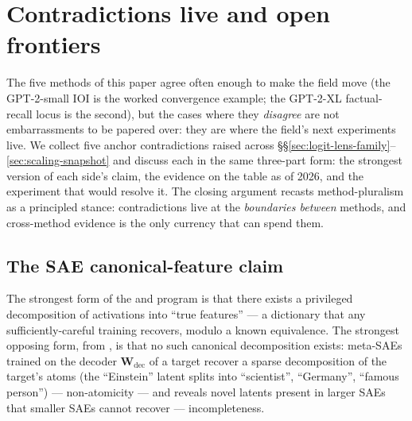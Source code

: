 
\section{Contradictions live and open frontiers}
\label{sec:contradictions}

The five methods of this paper agree often enough to make the field
move (the GPT-2-small IOI  is the worked convergence example;
the GPT-2-XL factual-recall locus is the second), but the cases where
they \emph{disagree} are not embarrassments to be papered over: they
are where the field's next experiments live. We collect five anchor
contradictions raised across \S\S\ref{sec:logit-lens-family}--\ref{sec:scaling-snapshot}
and discuss each in the same three-part form: the strongest version of
each side's claim, the evidence on the table as of 2026, and the
experiment that would resolve it. The closing argument recasts
method-pluralism as a principled stance: contradictions live at the
\emph{boundaries between} methods, and cross-method evidence is the
only currency that can spend them.

\subsection{The SAE canonical-feature claim}
\label{sec:contradictions-sae}

The strongest form of the \citet{bricken2023-monosemanticity} and
\citet{templeton2024-scaling-monosemanticity} program is that there
exists a privileged decomposition of activations into ``true features'' ---
a  dictionary that any sufficiently-careful  training
recovers, modulo a known equivalence. The strongest opposing form,
from \citet[\S 1]{leask2025-sae-not-canonical}, is that no such
canonical decomposition exists: meta-SAEs trained on the decoder
$\mathbf{W}_{\text{dec}}$ of a target  recover a sparse decomposition
of the target's atoms (the ``Einstein'' latent splits into
``scientist'', ``Germany'', ``famous person'') --- non-atomicity --- and
 reveals novel latents present in larger SAEs that smaller
SAEs cannot recover --- incompleteness.

